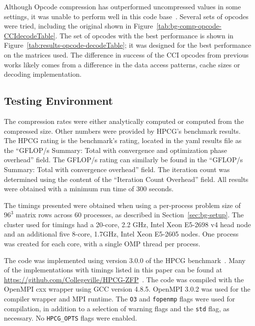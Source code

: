 Although Opcode compression has outperformed uncompressed values in some settings, it was unable to perform well in this code base~\cite{Lawlor:2013:compression}.
Several sets of opcodes were tried, including the original shown in Figure~\ref{tab:bg-comp-opcode-CCIdecodeTable}.
The set of opcodes with the best performance is shown in Figure~\ref{tab:results-opcode-decodeTable}; it was designed for the best performance on the matrices used.
The difference in success of the CCI opcodes from previous works likely comes from a difference in the data access patterns, cache sizes or decoding implementation.



\subsection{Testing Environment}
The compression rates were either analytically computed or computed from the compressed size.
Other numbers were provided by HPCG's benchmark results.
The HPCG rating is the benchmark's rating, located in the yaml results file as the ``GFLOP/s Summary: Total with convergence and optimization phase overhead'' field.
The GFLOP/s rating can similarly be found in the ``GFLOP/s Summary: Total with convergence overhead'' field.
The iteration count was determined using the content of the ``Iteration Count Overhead'' field.
All results were obtained with a minimum run time of 300 seconds.

The timings presented were obtained when using a per-process problem size of \(96^3\) matrix rows across 60 processes, as described in Section~\ref{sec:bg-setup}.
The cluster used for timings had a 20-core, 2.2 GHz, Intel Xeon E5-2698 v4 head node and an additional five 8-core, 1.7GHz, Intel Xeon E5-2605 nodes.
One process was created for each core, with a single OMP thread per process.

The code was implemented using version 3.0.0 of the HPCG benchmark~\cite{Dongarra:2015:HPCG}.
Many of the implementations with timings listed in this paper can be found at \url{https://github.com/Collegeville/HPCG-ZFP}~\cite{Lindquist:2018:projectGithub}.
The code was compiled with the OpenMPI cxx wrapper using GCC version 4.8.5.
OpenMPI 3.0.2 was used for the compiler wrapper and MPI runtime.
The \texttt{O3} and \texttt{fopenmp} flags were used for compilation, in addition to a selection of warning flags and the \texttt{std} flag, as necessary.
No \texttt{HPCG\_OPTS} flags were enabled.